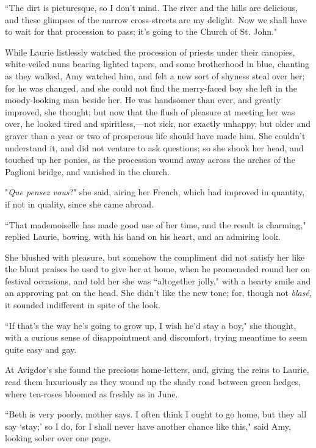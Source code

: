 ``The dirt is picturesque, so I don't mind. The river and
the hills are delicious, and these glimpses of the narrow cross-streets
are my delight. Now we shall have to wait for that procession to pass;
it's going to the Church of St. John."

While Laurie listlessly watched the procession of priests under their
canopies, white-veiled nuns bearing lighted tapers, and some brotherhood
in blue, chanting as they walked, Amy watched him, and felt a new sort
of shyness steal over her; for he was changed, and she could not find
the merry-faced boy she left in the moody-looking man beside her. He was
handsomer than ever, and greatly improved, she thought; but now that the
flush of pleasure at meeting her was over, he looked tired and
spiritless,---not sick, nor exactly unhappy, but older and graver than a
year or two of prosperous life should have made him. She
couldn't understand it, and did not venture to ask
questions; so she shook her head, and touched up her ponies, as the
procession wound away across the arches of the Paglioni bridge, and
vanished in the church.

"\emph{Que pensez vous}?" she said, airing her French, which had
improved in quantity, if not in quality, since she came abroad.

``That mademoiselle has made good use of her time, and the result is
charming," replied Laurie, bowing, with his hand on his heart, and an
admiring look.

She blushed with pleasure, but somehow the compliment did not satisfy
her like the blunt praises he used to give her at home, when he
promenaded round her on festival occasions, and told her she was
``altogether jolly," with a hearty smile and an approving pat on the
head. She didn't like the new tone; for, though not
\emph{blasé}, it sounded indifferent in spite of the look.

``If that's the way he's going to grow
up, I wish he'd stay a boy," she thought, with a curious
sense of disappointment and discomfort, trying meantime to seem quite
easy and gay.

At Avigdor's she found the precious home-letters, and,
giving the reins to Laurie, read them luxuriously as they wound up the
shady road between green hedges, where tea-roses bloomed as freshly as
in June.

``Beth is very poorly, mother says. I often think I ought to go home, but
they all say `stay;' so I do, for I
shall never have another chance like this," said Amy, looking sober over
one page.

